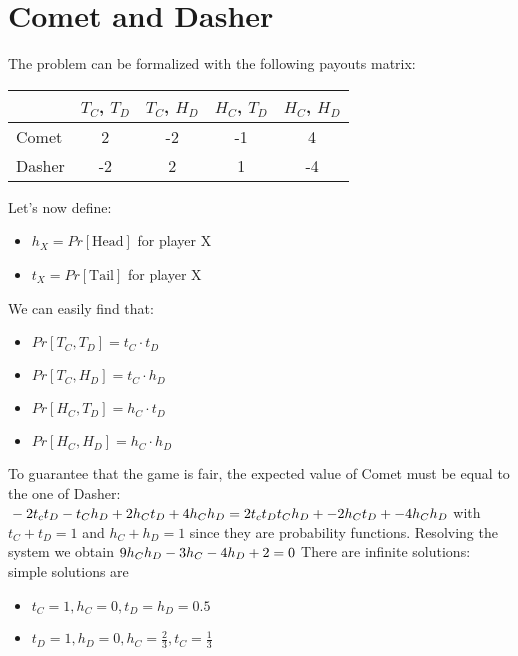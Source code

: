 \section{Comet and Dasher}
The problem can be formalized with the following payouts matrix:
\begin{center}
	\begin{tabular}{l*{4}{c}}
		& $T_C$, $T_D$ & $T_C$, $H_D$ & $H_C$, $T_D$ & $H_C$, $H_D$ \\
		\hline
		Comet & 2 & -2 & -1 & 4 \\
		\hline
		Dasher & -2 & 2 & 1 & -4 \\
	\end{tabular}
	
\end{center}
Let's now define:
\begin{itemize}
\item $h_X = Pr[\text{Head}]$ for player X
\item $t_X = Pr[\text{Tail}]$ for player X
\end{itemize}
We can easily find that:
\begin{itemize}
\item $Pr[T_C, T_D] = t_C \cdot t_D$
\item $Pr[T_C, H_D] = t_C \cdot h_D$
\item $Pr[H_C, T_D] = h_C \cdot t_D$
\item $Pr[H_C, H_D] = h_C \cdot h_D$
\end{itemize}
To guarantee that the game is fair, the expected value of Comet must be equal to the one of Dasher:
$\newline\newline-2 t_c t_D -t_C h_D + 2h_C t_D + 4 h_C h_D = 2 t_c t_D t_C h_D + -2h_C t_D + -4 h_C h_D\newline\newline$
with $t_C + t_D = 1$ and $h_C + h_D = 1$ since they are probability functions.
Resolving the system we obtain 
$\newline\newline9h_C h_D -3h_C - 4h_D +2 = 0\newline\newline$
There are infinite solutions: simple solutions are 
\begin{itemize}
	\item $t_C = 1, h_C = 0, t_D = h_D = 0.5$
	\item $t_D = 1, h_D = 0, h_C = \frac{2}{3}, t_C = \frac{1}{3}$	
\end{itemize}

